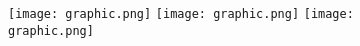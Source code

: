 \documentclass{ctexart} %
\begin{document}
\vspace{2\baselineskip}%
\begin{figure}[t] %
\texttt{[image: graphic.png]} %
\texttt{[image: graphic.png]}
\texttt{[image: graphic.png]}
\end{figure} %
\end{document}
